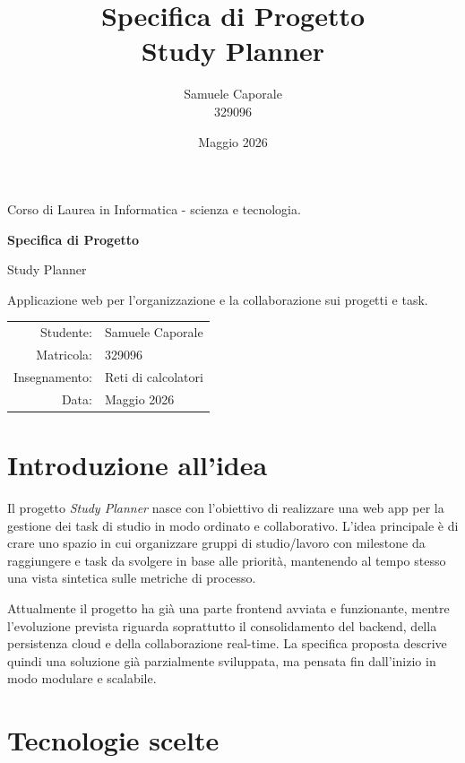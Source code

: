 \documentclass[12pt,a4paper]{article}
\title{\textbf{Specifica di Progetto}\\[0.4cm]\large Study Planner}
\author{Samuele Caporale \\ 329096}
\date{Maggio 2026}
\begin{document}
\hypersetup{pageanchor=false}
\begin{titlepage}
    \centering
    {\Large Corso di Laurea in Informatica - scienza e tecnologia. \par}
    \vspace{1.2cm}
    {\huge \textbf{Specifica di Progetto}\par}
    \vspace{0.4cm}
    {\LARGE Study Planner\par}
    \vspace{1cm}
    {\large Applicazione web per l'organizzazione e la collaborazione sui progetti e task.\par}
    \vfill
    \begin{tabular}{rl}
        Studente: & Samuele Caporale \\
        Matricola: & 329096 \\
        Insegnamento: & Reti di calcolatori \\
        Data: & Maggio 2026 \\
    \end{tabular}
    \vfill
\end{titlepage}
\hypersetup{pageanchor=true}

\section{Introduzione all'idea}

Il progetto \textit{Study Planner} nasce con l'obiettivo di realizzare una web app per la gestione dei task di studio in modo ordinato e collaborativo.
L'idea principale \`e di crare uno spazio in cui organizzare gruppi di studio/lavoro con milestone da raggiungere e task da svolgere in base alle priorità, mantenendo al tempo stesso una vista sintetica sulle metriche di processo.

Attualmente il progetto ha gi\`a una parte frontend avviata e funzionante, mentre l'evoluzione prevista riguarda soprattutto il consolidamento del backend, della persistenza cloud e della collaborazione real-time. La specifica proposta descrive quindi una soluzione gi\`a parzialmente sviluppata, ma pensata fin dall'inizio in modo modulare e scalabile.

\section{Tecnologie scelte}
\end{document}
